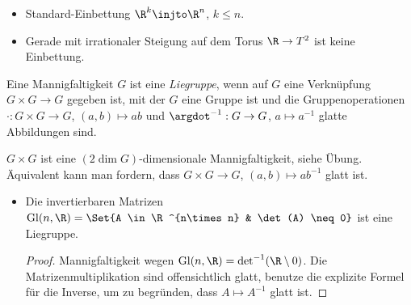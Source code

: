 \begin{ex}
    \begin{itemize}
        \item
            Standard-Einbettung $\R^k \injto \R^n$, $k \le n$.
        \item
            Gerade mit irrationaler Steigung auf dem Torus $\R \to T^2$ ist keine Einbettung.
    \end{itemize}
\end{ex}

\begin{df} \label{2.7}
    Eine Mannigfaltigkeit $G$ ist eine \emph{Liegruppe}, wenn auf $G$ eine Verknüpfung $G \times G \to G$ gegeben ist, mit der $G$ eine Gruppe ist und die Gruppenoperationen $\cdot: G \times G \to G$, $(a,b) \mapsto ab$ und $\argdot^{-1}: G \to G$, $a \mapsto a^{-1}$ glatte Abbildungen sind.
    \begin{note}
        $G \times G$ ist eine $(2 \dim G)$-dimensionale Mannigfaltigkeit, siehe Übung.
        Äquivalent kann man fordern, dass $G\times G \to G$, $(a,b) \mapsto ab^{-1}$ glatt ist.
    \end{note}
\end{df}

\begin{ex}
    \begin{itemize}
        \item
            Die invertierbaren Matrizen
            \begin{math}
                \Gl(n,\R) = \Set{A \in \R^{n\times n} & \det(A) \neq 0}
            \end{math}
            ist eine Liegruppe.
            \begin{proof}
                Mannigfaltigkeit wegen $\Gl(n,\R) = \det^{-1}(\R \setminus 0)$.
                Die Matrizenmultiplikation sind offensichtlich glatt, benutze die explizite Formel für die Inverse, um zu begründen, dass $A \mapsto A^{-1}$ glatt ist.
            \end{proof}
    \end{itemize}
\end{ex}
